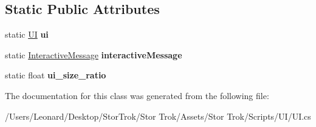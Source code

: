 \subsection*{Static Public Attributes}
\begin{DoxyCompactItemize}
\item 
\mbox{\label{class_u_i_ac3c93775a137d54dcf9c8f3d21de559d}} 
static \hyperlink{class_u_i}{UI} {\bfseries ui}
\item 
\mbox{\label{class_u_i_ae016d2fea17f8918c5e597c978278d07}} 
static \hyperlink{class_interactive_message}{Interactive\+Message} {\bfseries interactive\+Message}
\item 
\mbox{\label{class_u_i_adafbe9cbaaeafbf9d3bd281ddd3a371a}} 
static float {\bfseries ui\+\_\+size\+\_\+ratio}
\end{DoxyCompactItemize}


The documentation for this class was generated from the following file\+:\begin{DoxyCompactItemize}
\item 
/\+Users/\+Leonard/\+Desktop/\+Stor\+Trok/\+Stor Trok/\+Assets/\+Stor Trok/\+Scripts/\+U\+I/U\+I.\+cs\end{DoxyCompactItemize}
